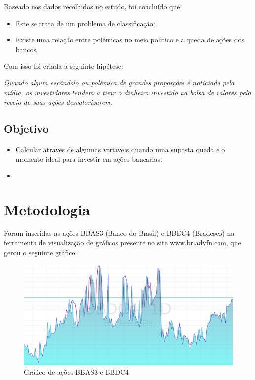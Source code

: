 \documentclass{sigchi}
\begin{document}
 Baseado nos dados recolhidos no estudo, foi concluído que: 
 \begin{itemize}
 
 \item{Este se trata de um problema de classificação;}
 \item{Existe uma relação entre polêmicas no meio politico e a queda de ações dos bancos.}
 
 \end{itemize}
Com isso foi criada a seguinte hipótese: 

\textit{
Quando algum escândalo ou polêmica de grandes proporções é noticiado pela mídia, os investidores tendem a tirar o dinheiro investido na bolsa de valores pelo receio de suas ações desvalorizarem.
}

\subsection{Objetivo}

\begin{itemize}
	
	\item Calcular atraves de algumas variaveis quando uma suposta queda e o momento ideal para investir em ações bancarias.
	\item 
\end{itemize}


\section{Metodologia}

Foram inseridas as ações BBAS3 (Banco do Brasil) e BBDC4 (Bradesco) na ferramenta de visualização de gráficos presente no site www.br.advfn.com, que gerou o seguinte gráfico: 

 \begin{figure}[!htb]
\centering
\includegraphics[scale=0.27]{./figures/figura1.png}
\caption{Gráfico de ações BBAS3 e BBDC4}
\label{fig1}
\end{figure}
\end{document}
